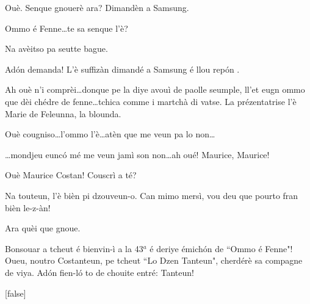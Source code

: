 \begin{drama}
\Vioupspeaks Ouè. Senque gnouerè ara? Dimandèn a Samsung.


\Vioupspeaks \og Ommo é Fenne\fg\ldots te sa senque l'è?

\Vioujspeaks{} Na avèitso pa seutte bague.

\Vioupspeaks Ad\'on demanda! L'è suffizàn dimandé a Samsung é llou rep\'on .


\Vioupspeaks Ah ouè n'i comprèi\ldots donque pe la diye avouì de paolle seumple, ll'et eugn ommo que dèi chédre de fenne\ldots tchica comme i martchà di vatse. La prézentatrise l'è Marie de Feleunna, la blounda.

\Vioujspeaks Ouè cougniso\ldots l'ommo l'è\ldots atèn que me veun pa lo non\ldots

\Vioupspeaks \ldots mondjeu eunc\'o mé me veun jamì son non\ldots ah oué! Maurice, Maurice!

\Vioujspeaks Ouè Maurice Costan! Couscrì a té?

\Vioupspeaks Na touteun, l'è bièn pi dzouveun-o. Can mimo mersì, vou deu que pourto fran bièn le-z-àn!

\Vioujspeaks Ara quèi que gnoue.








\Mariespeaks Bonsouar a tcheut é bienvin-ì a la 43$^a$ é deriye émich\'on de ``Ommo é Fenne"! Oueu, noutro Costanteun, pe tcheut ``Lo Dzen Tanteun", cherdérè sa compagne de viya. Ad\'on fien-l\'o to de chouite entré: Tanteun!

[false]%


\end{drama}
